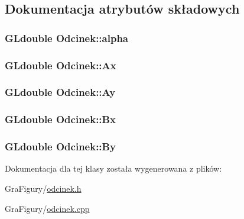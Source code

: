 \subsection{Dokumentacja atrybutów składowych}
\hypertarget{classOdcinek_afa62a8621db4414224de6ca68c80f91b}{
\subsubsection[{alpha}]{\setlength{\rightskip}{0pt plus 5cm}G\-Ldouble Odcinek\-::alpha\hspace{0.3cm}{\ttfamily [private]}}}\label{classOdcinek_afa62a8621db4414224de6ca68c80f91b}
\hypertarget{classOdcinek_a39b3b1acd7db3f6dc056e359d3db5b75}{
\subsubsection[{Ax}]{\setlength{\rightskip}{0pt plus 5cm}G\-Ldouble Odcinek\-::\-Ax\hspace{0.3cm}{\ttfamily [private]}}}\label{classOdcinek_a39b3b1acd7db3f6dc056e359d3db5b75}
\hypertarget{classOdcinek_ab2cd69558f00cd9b15e2309c5901b593}{
\subsubsection[{Ay}]{\setlength{\rightskip}{0pt plus 5cm}G\-Ldouble Odcinek\-::\-Ay\hspace{0.3cm}{\ttfamily [private]}}}\label{classOdcinek_ab2cd69558f00cd9b15e2309c5901b593}
\hypertarget{classOdcinek_ae133a5bdfe251589ac5aa7d3b55ff0c7}{
\subsubsection[{Bx}]{\setlength{\rightskip}{0pt plus 5cm}G\-Ldouble Odcinek\-::\-Bx\hspace{0.3cm}{\ttfamily [private]}}}\label{classOdcinek_ae133a5bdfe251589ac5aa7d3b55ff0c7}
\hypertarget{classOdcinek_a7be85a14be406b60a4a568dba20acd95}{
\subsubsection[{By}]{\setlength{\rightskip}{0pt plus 5cm}G\-Ldouble Odcinek\-::\-By\hspace{0.3cm}{\ttfamily [private]}}}\label{classOdcinek_a7be85a14be406b60a4a568dba20acd95}


Dokumentacja dla tej klasy została wygenerowana z plików\-:\begin{DoxyCompactItemize}
\item 
Gra\-Figury/\hyperlink{GraFigury_2odcinek_8h}{odcinek.\-h}\item 
Gra\-Figury/\hyperlink{GraFigury_2odcinek_8cpp}{odcinek.\-cpp}\end{DoxyCompactItemize}
